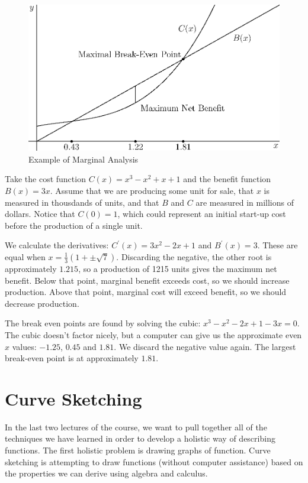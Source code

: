 \documentclass[fleqn]{report}
\begin{document}
\begin{figure}[t]
\centering
\includegraphics[width=12cm]{figure57.eps}
\caption{Example of Marginal Analysis}
\label{Example of Marginal Analysis}
\end{figure}

\begin{example}
Take the cost function $C(x) = x^3 - x^2 + x+
1$ and the benefit function $B(x) = 3x$. Assume that we are
producing some unit for sale, that $x$ is measured in
thousdands of units, and that $B$ and $C$ are measured in
millions of dollars. Notice that $C(0) = 1$, which could
represent an initial start-up cost before the production of a
single unit.

We calculate the derivatives: $C^\prime(x) = 3x^2 -2x+1$ and
$B^\prime(x) = 3$. These are equal when $x = \frac{1}{3} (1
+\pm \sqrt{7})$. Discarding the negative, the other root is
approximately $1.215$, so a production of 1215 units gives the
maximum net benefit. Below that point, marginal benefit
exceeds cost, so we should increase production. Above that
point, marginal cost will exceed benefit, so we should
decrease production. 

The break even points are found by solving the cubic: $x^3
-x^2-2x+1 - 3x = 0$. The cubic doesn't factor nicely, but a
computer can give us the approximate even $x$ values: $-1.25$,
$0.45$ and $1.81$. We discard the negative value again. The
largest break-even point is at approximately $1.81$. 
\end{example}

\chapter{Curve Sketching}
\label{Curve Sketching}

In the last two lectures of the course, we want to pull
together all of the techniques we have learned in order to
develop a holistic way of describing functions. The first
holistic problem is drawing graphs of function. Curve
sketching is attempting to draw functions (without computer
assistance) based on the properties we can derive using
algebra and calculus. 
\end{document}
